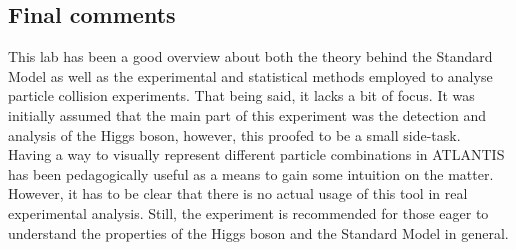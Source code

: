 \documentclass[twoside,        %
               BCOR12mm,       %
               ngerman,english, %
               fleqn,headsepline=false,footsepline=false
              ]{Vorlage/MFPREPORT}
\begin{document}
\subsection{Final comments}
This lab has been a good overview about both the theory behind the Standard
Model as well as the experimental and statistical methods employed to analyse
particle collision experiments. That being said, it lacks a bit of focus. It
was initially assumed that the main part of this experiment was the detection
and analysis of the Higgs boson, however, this proofed to be a small side-task.
\\Having a way to visually represent different particle combinations in
ATLANTIS has been pedagogically useful as a means to gain some intuition on the
matter. However, it has to be clear that there is no actual usage of this tool
in real experimental analysis.
Still, the experiment is recommended for those eager to understand the
properties of the Higgs boson and the Standard Model in general.



\end{document}
